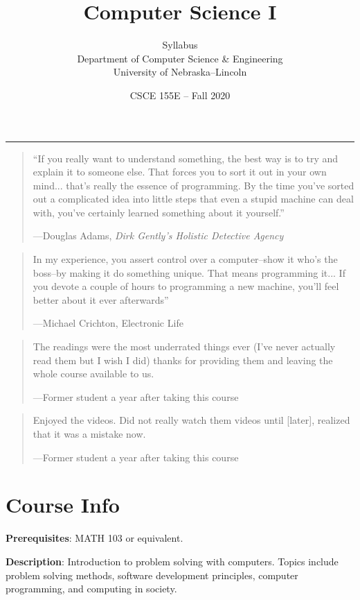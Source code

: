 \documentclass[12pt]{scrartcl}
\title{Computer Science I}\let\Title\@title
\subtitle{Syllabus\\
{\small
\vskip1cm
Department of Computer Science \& Engineering \\
University of Nebraska--Lincoln}
\vskip-1cm}
\date{CSCE 155E -- Fall 2020}
\begin{document}
\maketitle


\hrule

\begin{quote}
``If you really want to understand something, the best way is to try and explain it to someone else. That forces you to sort it out in your own mind... that's really the essence of programming. By the time you've sorted out a complicated idea into little steps that even a stupid machine can deal with, you've certainly learned something about it yourself.'' 

\hfill ---Douglas Adams, \emph{Dirk Gently's Holistic Detective Agency}
\end{quote}

\begin{quote}
In my experience, you assert control over a computer--show it who's the boss--by making it do something unique. That means programming it... If you devote a couple of hours to programming a new machine, you'll feel better about it ever afterwards'' 

\hfill ---Michael Crichton, Electronic Life
\end{quote}

\begin{quote}
The readings were the most underrated things ever (I've never actually read them but I wish I did) thanks for providing them and leaving the whole course available to us. 

\hfill ---Former student a year after taking this course
\end{quote}

\begin{quote}
Enjoyed the videos. Did not really watch them videos until [later],
realized that it was a mistake now.

\hfill ---Former student a year after taking this course
\end{quote}

\section{Course Info}

\textbf{Prerequisites}: MATH 103 or equivalent.

\textbf{Description}: Introduction to problem solving with computers. 
Topics include problem solving methods, software development 
principles, computer programming, and computing in society.
\end{document}
